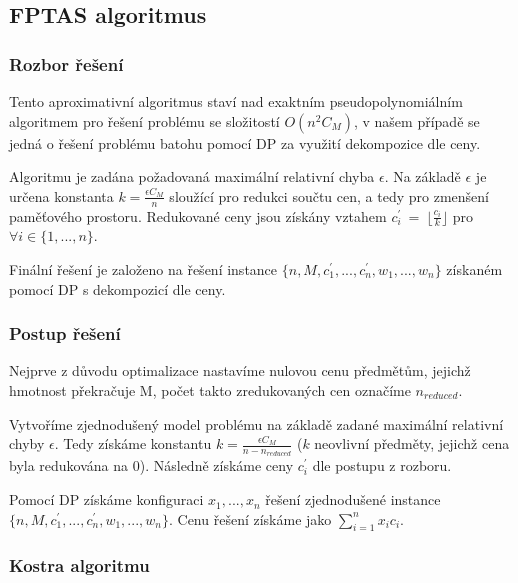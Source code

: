 \documentclass[12pt]{article}
\begin{document}
\newpage

\subsection{FPTAS algoritmus}

\subsubsection{Rozbor řešení}

Tento aproximativní algoritmus staví nad exaktním pseudopolynomiálním algoritmem pro řešení problému se složitostí $O(n^2 C_M)$, v našem případě se jedná o řešení problému batohu pomocí DP za využití dekompozice dle ceny.

Algoritmu je zadána požadovaná maximální relativní chyba $\epsilon$. Na základě $\epsilon$ je určena konstanta $k = \frac{\epsilon C_M}{n}$ sloužící pro redukci součtu cen, a tedy pro zmenšení paměťového prostoru.
Redukované ceny jsou získány vztahem $c_i^{'}~=~\lfloor\frac{c_i}{k}\rfloor$ pro $\forall i \in \{1, ..., n\}$.

Finální řešení je založeno na řešení instance $\{n, M, c_1^{'}, ..., c_n^{'}, w_1, ...,w_n\}$ získaném pomocí DP s dekompozicí dle ceny.

\subsubsection{Postup řešení}

Nejprve z důvodu optimalizace nastavíme nulovou cenu předmětům, jejichž hmotnost překračuje M, počet takto zredukovaných cen označíme $n_{reduced}$.

Vytvoříme zjednodušený model problému na základě zadané maximální relativní chyby $\epsilon$. Tedy získáme konstantu $k=\frac{\epsilon C_{M}}{n-n_{reduced}}$ ($k$ neovlivní předměty, jejichž cena byla redukována na 0). Následně získáme ceny $c_i^{'}$ dle postupu z rozboru.

Pomocí DP získáme konfiguraci ${x_1, ..., x_n}$ řešení zjednodušené instance $\{n, M, c_1^{'}, ..., c_n^{'}, w_1, ...,w_n\}$. Cenu řešení získáme jako $\sum_{i=1}^{n}x_ic_i$.

\newpage

\subsubsection{Kostra algoritmu}
\end{document}
